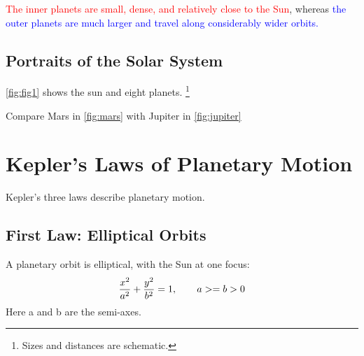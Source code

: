 \documentclass{article}
\begin{document}
\textcolor{red}{The inner planets are small, dense, and relatively close to the Sun}, whereas \textcolor{blue}{the outer planets are much larger and travel along considerably wider orbits.}

\subsection{Portraits of the Solar System}
\ref{fig:fig1} shows the sun and eight planets.
\footnote{Sizes and distances are schematic.}

Compare Mars in \ref{fig:mars} with Jupiter in \ref{fig:jupiter}


\section{Kepler’s Laws of Planetary Motion}
Kepler’s three laws describe planetary motion\cite{nasa_kepler}.
\subsection{First Law: Elliptical Orbits}

A planetary orbit is elliptical, with the Sun at one focus:
\begin{equation}
    \frac{x^2}{a^2} + \frac{y^2}{b^2} = 1, \hspace{20px} a >= b > 0
\end{equation}
Here a and b are the semi-axes.
\end{document}
